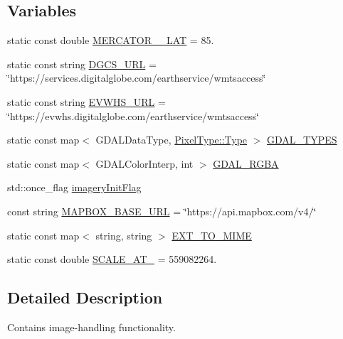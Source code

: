 \subsection*{Variables}
\begin{DoxyCompactItemize}
\item 
static const double \hyperlink{namespacedg_1_1deepcore_1_1imagery_a1e4fbd4aaf439a533b4ca96449f5b025}{M\+E\+R\+C\+A\+T\+O\+R\+\_\+\_\+\+L\+AT} = 85.
\item 
static const string \hyperlink{namespacedg_1_1deepcore_1_1imagery_a9e7cface2b675ff0c56c3ab563fddb0e}{D\+G\+C\+S\+\_\+\+U\+RL} = \char`\"{}https\+://services.\+digitalglobe.\+com/earthservice/wmtsaccess\char`\"{}
\item 
static const string \hyperlink{namespacedg_1_1deepcore_1_1imagery_a3b7112a63b420c78b01c83d0f434aff9}{E\+V\+W\+H\+S\+\_\+\+U\+RL} = \char`\"{}https\+://evwhs.\+digitalglobe.\+com/earthservice/wmtsaccess\char`\"{}
\item 
static const map$<$ G\+D\+A\+L\+Data\+Type, \hyperlink{namespacedg_1_1deepcore_1_1imagery_1_1_pixel_type_a5f0c62edf4601cbd15e52b381697069d}{Pixel\+Type\+::\+Type} $>$ \hyperlink{namespacedg_1_1deepcore_1_1imagery_a3789b9a347ec09b23d7d45351cc87707}{G\+D\+A\+L\+\_\+\+T\+Y\+P\+ES}
\item 
static const map$<$ G\+D\+A\+L\+Color\+Interp, int $>$ \hyperlink{namespacedg_1_1deepcore_1_1imagery_a3e6b06d7bc0e97ec15a9c43b65740ad6}{G\+D\+A\+L\+\_\+\+R\+G\+BA}
\item 
std\+::once\+\_\+flag \hyperlink{namespacedg_1_1deepcore_1_1imagery_a5bd34f6242dc2b966d56787202281cd3}{imagery\+Init\+Flag}
\item 
const string \hyperlink{namespacedg_1_1deepcore_1_1imagery_a977bcd35334fda555ec11800e73afacd}{M\+A\+P\+B\+O\+X\+\_\+\+B\+A\+S\+E\+\_\+\+U\+RL} = \char`\"{}https\+://api.\+mapbox.\+com/v4/\char`\"{}
\item 
static const map$<$ string, string $>$ \hyperlink{namespacedg_1_1deepcore_1_1imagery_ac6e711bbab3158f9c5e5d9e283dea88d}{E\+X\+T\+\_\+\+T\+O\+\_\+\+M\+I\+ME}
\item 
static const double \hyperlink{namespacedg_1_1deepcore_1_1imagery_a38334ae0e39b6cb795feceeaf7e36a77}{S\+C\+A\+L\+E\+\_\+\+A\+T\+\_} = 559082264.
\end{DoxyCompactItemize}


\subsection{Detailed Description}
Contains image-\/handling functionality. 

